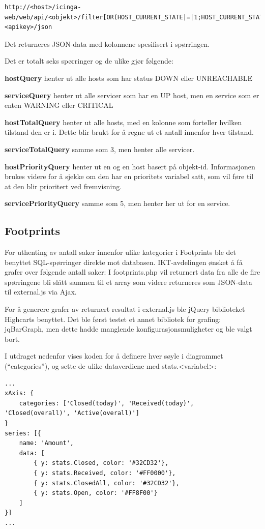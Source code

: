 \begin{lstlisting}[style=example]
http://<host>/icinga-web/web/api/<objekt>/filter[OR(HOST_CURRENT_STATE|=|1;HOST_CURRENT_STATE|=|2)]/columns[HOST_ID|HOST_CURRENT_CHECK_ATTEMPT|...]/authkey=<apikey>/json
\end{lstlisting}
Det returneres JSON-data med kolonnene spesifisert i spørringen.

Det er totalt seks spørringer og de ulike gjør følgende:
\begin{enumerate*}\label{sporringer}
	\item  \textbf{hostQuery} henter ut alle hosts som har status DOWN eller UNREACHABLE
	\item  \textbf{serviceQuery} henter ut alle servicer som har en UP host, men en service som er enten WARNING eller CRITICAL
	\item  \textbf{hostTotalQuery} henter ut alle hosts, med en kolonne som forteller hvilken tilstand den er i. Dette blir brukt for å regne ut et antall innenfor hver tilstand.
	\item  \textbf{serviceTotalQuery} samme som 3, men henter alle servicer.
	\item  \textbf{hostPriorityQuery} henter ut en og en host basert på objekt-id. Informasjonen brukes videre for å sjekke om den har en prioritets variabel satt, som vil føre til at den blir prioritert ved fremvisning.
	\item  \textbf{servicePriorityQuery} samme som 5, men henter her ut for en service.
\end{enumerate*}

\subsection{Footprints}
For uthenting av antall saker innenfor ulike kategorier i Footprints ble det benyttet SQL-spørringer direkte mot databasen. IKT-avdelingen ønsket å få grafer over følgende antall saker:
I footprints.php vil returnert data fra alle de fire spørringene bli slått sammen til et array som videre returneres som JSON-data til external.js via Ajax. 

For å generere grafer av returnert resultat i external.js ble jQuery biblioteket Highcarts benyttet. Det ble først testet et annet bibliotek for grafing: jqBarGraph, men dette hadde manglende konfigurasjonsmuligheter og ble valgt bort. 

I utdraget nedenfor vises koden for å definere hver søyle i diagrammet (``categories''), og sette de ulike dataverdiene med stats.<variabel>:
\begin{lstlisting}[style=example]
...
xAxis: {
    categories: ['Closed(today)', 'Received(today)', 'Closed(overall)', 'Active(overall)']
}
series: [{
    name: 'Amount',
    data: [
        { y: stats.Closed, color: '#32CD32'},
        { y: stats.Received, color: '#FF0000'},
        { y: stats.ClosedAll, color: '#32CD32'},
        { y: stats.Open, color: '#FF8F00'}
    ]
}]
...
\end{lstlisting}

